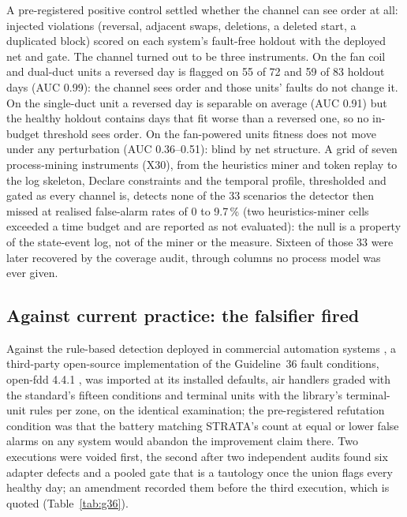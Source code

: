 \documentclass[11pt,letterpaper]{article}
\begin{document}
A pre-registered positive control settled whether the channel can see order at all: injected violations (reversal, adjacent swaps, deletions, a deleted start, a duplicated block) scored on each system's fault-free holdout with the deployed net and gate. The channel turned out to be three instruments. On the fan coil and dual-duct units a reversed day is flagged on 55 of 72 and 59 of 83 holdout days (AUC 0.99): the channel sees order and those units' faults do not change it. On the single-duct unit a reversed day is separable on average (AUC 0.91) but the healthy holdout contains days that fit worse than a reversed one, so no in-budget threshold sees order. On the fan-powered units fitness does not move under any perturbation (AUC 0.36--0.51): blind by net structure. A grid of seven process-mining instruments (X30), from the heuristics miner and token replay to the log skeleton, Declare constraints and the temporal profile, thresholded and gated as every channel is, detects none of the 33 scenarios the detector then missed at realised false-alarm rates of 0 to 9.7\,\% (two heuristics-miner cells exceeded a time budget and are reported as not evaluated): the null is a property of the state-event log, not of the miner or the measure. Sixteen of those 33 were later recovered by the coverage audit, through columns no process model was ever given.

\subsection{Against current practice: the falsifier fired}
\label{sec:baseline}

Against the rule-based detection deployed in commercial automation systems \cite{granderson2017fddtoolsurvey}, a third-party open-source implementation of the Guideline~36 fault conditions, open-fdd 4.4.1 \cite{openfdd2025}, was imported at its installed defaults, air handlers graded with the standard's fifteen conditions and terminal units with the library's terminal-unit rules per zone, on the identical examination; the pre-registered refutation condition was that the battery matching STRATA's count at equal or lower false alarms on any system would abandon the improvement claim there. Two executions were voided first, the second after two independent audits found six adapter defects and a pooled gate that is a tautology once the union flags every healthy day; an amendment recorded them before the third execution, which is quoted (Table~\ref{tab:g36}).
\end{document}
